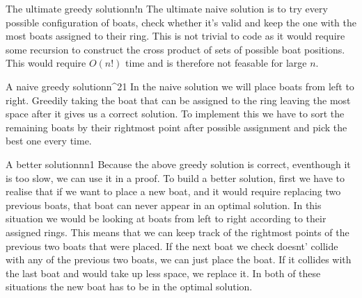 \documentclass{writeup}
\begin{document}

\begin{solutions}
  \begin{solution}{The ultimate greedy solution}{n!}{n}
    The ultimate naive solution is to try every possible configuration of boats, check whether it's valid and keep the one with the most boats assigned to their ring.
    This is not trivial to code as it would require some recursion to construct the cross product of sets of possible boat positions.
    This would require $O(n!)$ time and is therefore not feasable for large $n$.
  \end{solution}
  
  \begin{solution}{A naive greedy solution}{n^2}{1}
    In the naive solution we will place boats from left to right.
    Greedily taking the boat that can be assigned to the ring leaving the most space after it gives us a correct solution.
    To implement this we have to sort the remaining boats by their rightmost point after possible assignment and pick the best one every time.

  \end{solution}

  \begin{solution}{A better solution}{n\log n}{1}
    Because the above greedy solution is correct, eventhough it is too slow, we can use it in a proof.
    To build a better solution, first we have to realise that if we want to place a new boat, and it would require replacing two previous boats, that boat can never appear in an optimal solution.
    In this situation we would be looking at boats from left to right according to their assigned rings.
    This means that we can keep track of the rightmost points of the previous two boats that were placed.
    If the next boat we check doesnt' collide with any of the previous two boats, we can just place the boat.
    If it collides with the last boat and would take up less space, we replace it.
    In both of these situations the new boat has to be in the optimal solution.
  \end{solution}
\end{solutions}
\end{document}
